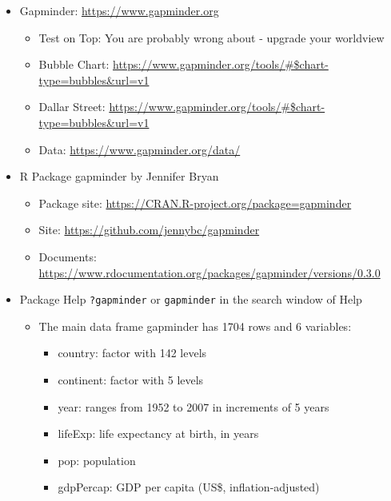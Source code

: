 \documentclass[
  xelatex, ja=standard]{bxjsbook}
\providecommand{\tightlist}{%
  \setlength{\itemsep}{0pt}\setlength{\parskip}{0pt}}
\theoremstyle{definition}
\theoremstyle{definition}
\theoremstyle{definition}
\theoremstyle{definition}
\theoremstyle{remark}
\begin{document}
\begin{itemize}
\item
  Gapminder: \url{https://www.gapminder.org}

  \begin{itemize}
  \tightlist
  \item
    Test on Top: You are probably wrong about - upgrade your worldview
  \item
    Bubble Chart: \url{https://www.gapminder.org/tools/\#$chart-type=bubbles\&url=v1}
  \item
    Dallar Street: \url{https://www.gapminder.org/tools/\#$chart-type=bubbles\&url=v1}
  \item
    Data: \url{https://www.gapminder.org/data/}
  \end{itemize}
\item
  R Package gapminder by Jennifer Bryan

  \begin{itemize}
  \tightlist
  \item
    Package site: \url{https://CRAN.R-project.org/package=gapminder}
  \item
    Site: \url{https://github.com/jennybc/gapminder}
  \item
    Documents: \url{https://www.rdocumentation.org/packages/gapminder/versions/0.3.0}
  \end{itemize}
\item
  Package Help \texttt{?gapminder} or \texttt{gapminder} in the search window of Help

  \begin{itemize}
  \tightlist
  \item
    The main data frame gapminder has 1704 rows and 6 variables:

    \begin{itemize}
    \tightlist
    \item
      country: factor with 142 levels
    \item
      continent: factor with 5 levels
    \item
      year: ranges from 1952 to 2007 in increments of 5 years
    \item
      lifeExp: life expectancy at birth, in years
    \item
      pop: population
    \item
      gdpPercap: GDP per capita (US\$, inflation-adjusted)
    \end{itemize}
  \end{itemize}
\end{itemize}
\end{document}
